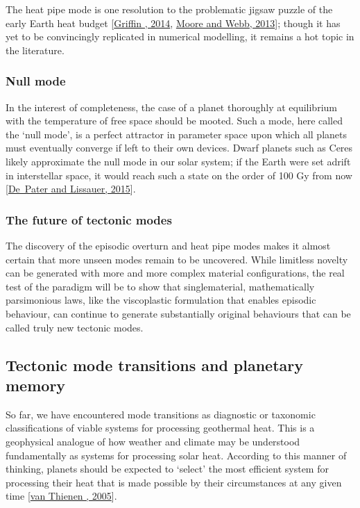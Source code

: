 \documentclass[letterpaper,10pt,english]{jupyterBook}
\begin{document}
\sphinxAtStartPar
The heat pipe mode is one resolution to the problematic jigsaw puzzle of the early Earth heat budget {[}\hyperlink{cite.references:id363}{Griffin , 2014}, \hyperlink{cite.references:id15}{Moore and Webb, 2013}{]}; though it has yet to be convincingly replicated in numerical modelling, it remains a hot topic in the literature.


\subsubsection{Null mode}
\label{\detokenize{content/chapter_01_background/main:null-mode}}
\sphinxAtStartPar
In the interest of completeness, the case of a planet thoroughly at equilibrium with the temperature of free space should be mooted. Such a mode, here called the ‘null mode’, is a perfect attractor in parameter space upon which all planets must eventually converge if left to their own devices. Dwarf planets such as Ceres likely approximate the null mode in our solar system; if the Earth were set adrift in interstellar space, it would reach such a state on the order of 100 Gy from now {[}\hyperlink{cite.references:id503}{De Pater and Lissauer, 2015}{]}.


\subsubsection{The future of tectonic modes}
\label{\detokenize{content/chapter_01_background/main:the-future-of-tectonic-modes}}
\sphinxAtStartPar
The discovery of the episodic overturn and heat pipe modes makes it almost certain that more unseen modes remain to be uncovered. While limitless novelty can be generated with more and more complex material configurations, the real test of the paradigm will be to show that single\sphinxhyphen{}material, mathematically parsimonious laws, like the viscoplastic formulation that enables episodic behaviour, can continue to generate substantially original behaviours that can be called truly new tectonic modes.


\subsection{Tectonic mode transitions and planetary memory}
\label{\detokenize{content/chapter_01_background/main:tectonic-mode-transitions-and-planetary-memory}}
\sphinxAtStartPar
So far, we have encountered mode transitions as diagnostic or taxonomic classifications of viable systems for processing geothermal heat. This is a geophysical analogue of how weather and climate may be understood fundamentally as systems for processing solar heat. According to this manner of thinking, planets should be expected to ‘select’ the most efficient system for processing their heat that is made possible by their circumstances at any given time {[}\hyperlink{cite.references:id113}{van Thienen , 2005}{]}.
\end{document}
